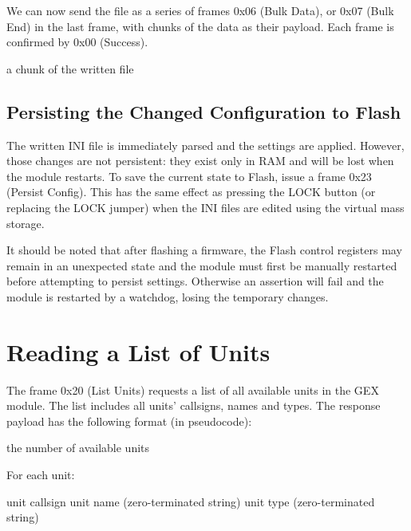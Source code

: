 We can now send the file as a series of frames 0x06 (Bulk Data), or 0x07 (Bulk End) in the last frame, with chunks of the data as their payload. Each frame is confirmed by 0x00 (Success).

\begin{boxedpayload}
	 a chunk of the written file
\end{boxedpayload}

\subsection{Persisting the Changed Configuration to Flash}

The written INI file is immediately parsed and the settings are applied. However, those changes are not persistent: they exist only in RAM and will be lost when the module restarts. To save the current state to Flash, issue a frame 0x23 (Persist Config). This has the same effect as pressing the LOCK button (or replacing the LOCK jumper) when the INI files are edited using the virtual mass storage.

It should be noted that after flashing a firmware, the Flash control registers may remain in an unexpected state and the module must first be manually restarted before attempting to persist settings. Otherwise an assertion will fail and the module is restarted by a watchdog, losing the temporary changes.



\section{Reading a List of Units}

The frame 0x20 (List Units) requests a list of all available units in the GEX module. The list includes all units' callsigns, names and types. The response payload has the following format (in pseudocode):

\begin{boxedpayload}
	 the number of available units
	\item For each unit:
		\begin{pldlist}
			 unit callsign
			 unit name (zero-terminated string)
			 unit type (zero-terminated string)
		\end{pldlist}
\end{boxedpayload}


